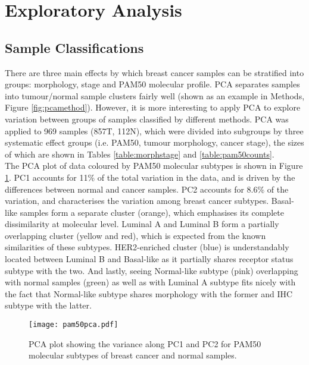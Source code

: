     
\section{Exploratory Analysis}


    \subsection{Sample Classifications}

    There are three main effects by which breast cancer samples can be stratified into groups: morphology, stage and PAM50 molecular profile. PCA separates samples into tumour/normal sample clusters fairly well (shown as an example in Methods, Figure \ref{fig:pcamethod}). However, it is more interesting to apply PCA to explore variation between groups of samples classified by different methods.  
    PCA was applied to 969 samples (857T, 112N), which were divided into subgroups by three systematic effect groups (i.e. PAM50, tumour morphology, cancer stage), the sizes of which are shown in Tables \ref{table:morphstage} and \ref{table:pam50counts}. \\
    The PCA plot of data coloured by PAM50 molecular subtypes is shown in Figure \ref{fig:pcapam50}. PC1 accounts for 11\% of the total variation in the data, and is driven by the differences between normal and cancer samples. PC2 accounts for 8.6\% of the variation, and characterises the variation among breast cancer subtypes. Basal-like samples form a separate cluster (orange), which emphasises its complete dissimilarity at molecular level. Luminal A and Luminal B form a partially overlapping cluster (yellow and red), which is expected from the known similarities of these subtypes. HER2-enriched cluster (blue) is understandably located between Luminal B and Basal-like as it partially shares receptor status subtype with the two. And lastly, seeing Normal-like subtype (pink) overlapping with normal samples (green) as well as with Luminal A subtype fits nicely with the fact that Normal-like subtype shares morphology with the former and IHC subtype with the latter.    
    
            \begin{figure}[!h]
            \centering
            \texttt{[image: pam50pca.pdf]} 
            \caption[PCA plot showing separation by PAM50 subtypes (2D)]{PCA plot showing the variance along PC1 and PC2 for PAM50 molecular subtypes of breast cancer and normal samples.}
            \label{fig:pcapam50}
            \end{figure}
            
